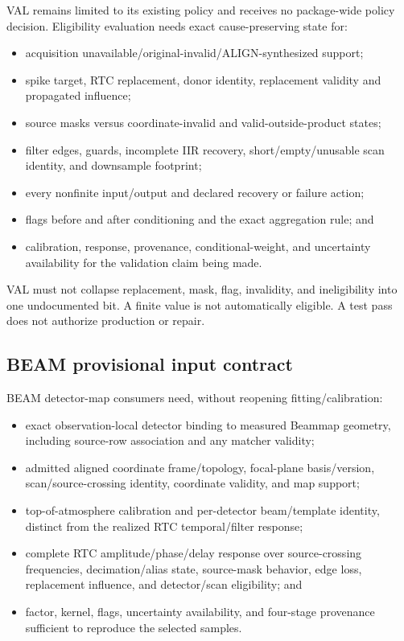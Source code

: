 \documentclass[11pt]{article}
\begin{document}
VAL remains limited to its existing policy and receives no package-wide policy
decision.  Eligibility evaluation needs exact cause-preserving state for:

\begin{itemize}
\item acquisition unavailable/original-invalid/ALIGN-synthesized support;
\item spike target, RTC replacement, donor identity, replacement validity and
      propagated influence;
\item source masks versus coordinate-invalid and valid-outside-product states;
\item filter edges, guards, incomplete IIR recovery, short/empty/unusable scan
      identity, and downsample footprint;
\item every nonfinite input/output and declared recovery or failure action;
\item flags before and after conditioning and the exact aggregation rule; and
\item calibration, response, provenance, conditional-weight, and uncertainty
      availability for the validation claim being made.
\end{itemize}

VAL must not collapse replacement, mask, flag, invalidity, and ineligibility
into one undocumented bit.  A finite value is not automatically eligible.  A
test pass does not authorize production or repair.

\subsection{BEAM provisional input contract}

BEAM detector-map consumers need, without reopening fitting/calibration:

\begin{itemize}
\item exact observation-local detector binding to measured Beammap geometry,
      including source-row association and any matcher validity;
\item admitted aligned coordinate frame/topology, focal-plane basis/version,
      scan/source-crossing identity, coordinate validity, and map support;
\item top-of-atmosphere calibration and per-detector beam/template identity,
      distinct from the realized RTC temporal/filter response;
\item complete RTC amplitude/phase/delay response over source-crossing
      frequencies, decimation/alias state, source-mask behavior, edge loss,
      replacement influence, and detector/scan eligibility; and
\item factor, kernel, flags, uncertainty availability, and four-stage
      provenance sufficient to reproduce the selected samples.
\end{itemize}
\end{document}
